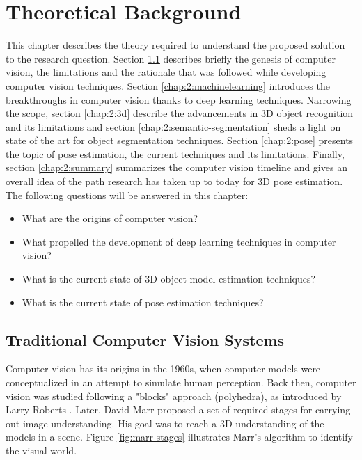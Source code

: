 \chapter{Theoretical Background}\label{chap:background}
This chapter describes the theory required to understand the proposed solution to the research question. Section \ref{chap:2:compvis} describes briefly the genesis of computer vision, the limitations and the rationale that was followed while developing computer vision techniques. Section \ref{chap:2:machinelearning} introduces the breakthroughs in computer vision thanks to deep learning techniques. Narrowing the scope, section \ref{chap:2:3d} describe the advancements in 3D object recognition and its limitations and section \ref{chap:2:semantic-segmentation} sheds a light on state of the art for object segmentation techniques. Section \ref{chap:2:pose} presents the topic of pose estimation, the current techniques and its limitations. Finally, section \ref{chap:2:summary} summarizes the computer vision timeline and gives an overall idea of the path research has taken up to today for 3D pose estimation. The following questions will be answered in this chapter:
\begin{itemize}
    \item What are the origins of computer vision?
    \item What propelled the development of deep learning techniques in computer vision?
    \item What is the current state of 3D object model estimation techniques?
    \item What is the current state of pose estimation techniques?
\end{itemize}

\section{Traditional Computer Vision Systems}\label{chap:2:compvis}
Computer vision has its origins in the 1960s, when computer models were conceptualized in an attempt to simulate human perception. Back then, computer vision was studied following a "blocks" approach (polyhedra), as introduced by Larry Roberts \cite{huang1996computer}. Later, David Marr proposed a set of required stages for carrying out image understanding. His goal was to reach a 3D understanding of the models in a scene. Figure \ref{fig:marr-stages} illustrates Marr's algorithm to identify the visual world. 


